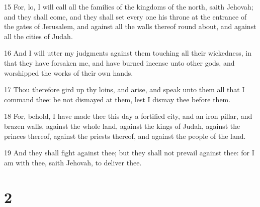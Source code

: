 \par 15 For, lo, I will call all the families of the kingdoms of the north, saith Jehovah; and they shall come, and they shall set every one his throne at the entrance of the gates of Jerusalem, and against all the walls thereof round about, and against all the cities of Judah.
\par 16 And I will utter my judgments against them touching all their wickedness, in that they have forsaken me, and have burned incense unto other gods, and worshipped the works of their own hands.
\par 17 Thou therefore gird up thy loins, and arise, and speak unto them all that I command thee: be not dismayed at them, lest I dismay thee before them.
\par 18 For, behold, I have made thee this day a fortified city, and an iron pillar, and brazen walls, against the whole land, against the kings of Judah, against the princes thereof, against the priests thereof, and against the people of the land.
\par 19 And they shall fight against thee; but they shall not prevail against thee: for I am with thee, saith Jehovah, to deliver thee.

\chapter{2}

